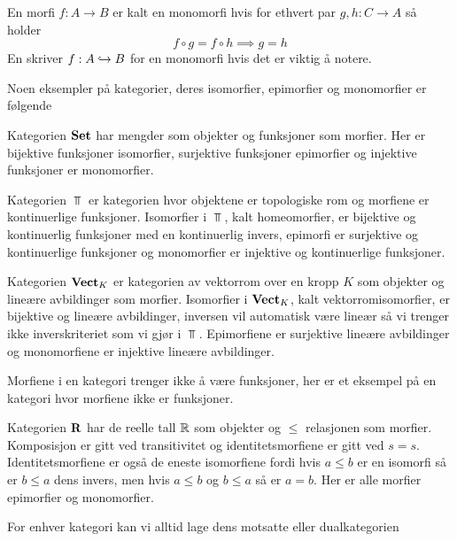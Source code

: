 \begin{definisjon}\label{Def:Mono}
    En morfi $f: A\to B$ er kalt en monomorfi hvis for ethvert par $g,h: C\to A$ så holder
    \[f\circ g = f\circ h \implies g=h\]
    En skriver $f: A\hookrightarrow B$ for en monomorfi hvis det er viktig å notere.
\end{definisjon}

Noen eksempler på kategorier, deres isomorfier, epimorfier og monomorfier er følgende
\begin{eksempel}\label{Ex:Set}
    Kategorien $\textnormal{\textbf{Set}}$ har mengder som objekter og
    funksjoner som morfier. Her er bijektive funksjoner
    isomorfier, surjektive funksjoner epimorfier og
    injektive funksjoner er monomorfier.
\end{eksempel}

\begin{eksempel}\label{Ex:TopKat}
    Kategorien $\Top$ er kategorien hvor objektene er topologiske rom og morfiene er kontinuerlige funksjoner. Isomorfier i $\Top$, kalt homeomorfier, er bijektive og kontinuerlig funksjoner med en kontinuerlig invers, epimorfi er surjektive og kontinuerlige funksjoner og monomorfier er injektive og kontinuerlige funksjoner. 
\end{eksempel}

\begin{eksempel}\label{Ex:VektKat}
    Kategorien $\textnormal{\textbf{Vect}}_K$ er kategorien av vektorrom over en kropp $K$ som objekter og lineære avbildinger som morfier. Isomorfier i $\textnormal{\textbf{Vect}}_K$, kalt vektorromisomorfier, er bijektive og lineære avbildinger, inversen vil automatisk være lineær så vi trenger ikke inverskriteriet som vi gjør i $\Top$. Epimorfiene er surjektive lineære avbildinger og monomorfiene er injektive lineære avbildinger.
\end{eksempel}

Morfiene i en kategori trenger ikke å være funksjoner, her er et eksempel på en kategori hvor morfiene ikke er funksjoner.
\begin{eksempel}\label{Ex:RPoset}
    Kategorien $\textnormal{\textbf{{R}}}$ har de reelle tall $\mathbb{R}$ som objekter og $\leq$ relasjonen som morfier. Komposisjon er gitt ved transitivitet og identitetsmorfiene er gitt ved $s=s$. Identitetsmorfiene er også de eneste isomorfiene fordi hvis $a\leq b$ er en isomorfi så er $b\leq a$ dens invers, men hvis $a\leq b$ og $b\leq a$ så er $a=b$. Her er alle morfier epimorfier og monomorfier.
\end{eksempel}

For enhver kategori kan vi alltid lage dens
motsatte eller dualkategorien

